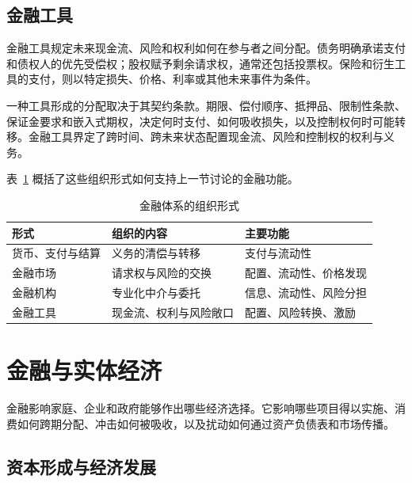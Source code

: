 \subsection{金融工具}

金融工具规定未来现金流、风险和权利如何在参与者之间分配。债务明确承诺支付和债权人的优先受偿权；股权赋予剩余请求权，通常还包括投票权。保险和衍生工具的支付，则以特定损失、价格、利率或其他未来事件为条件。

一种工具形成的分配取决于其契约条款。期限、偿付顺序、抵押品、限制性条款、保证金要求和嵌入式期权，决定何时支付、如何吸收损失，以及控制权何时可能转移。金融工具界定了跨时间、跨未来状态配置现金流、风险和控制权的权利与义务。

\par\medskip
\noindent
表~\ref{tab:ch1-architecture} 概括了这些组织形式如何支持上一节讨论的金融功能。

\begin{table}[H]
\centering

\caption{金融体系的组织形式}
\label{tab:ch1-architecture}

\begin{tabularx}{\textwidth}{@{}p{3.0cm}X X@{}}
\toprule
\textbf{形式}
&
\textbf{组织的内容}
&
\textbf{主要功能}
\\
\midrule

货币、支付与结算
&
义务的清偿与转移
&
支付与流动性
\\

金融市场
&
请求权与风险的交换
&
配置、流动性、价格发现
\\

金融机构
&
专业化中介与委托
&
信息、流动性、风险分担
\\

金融工具
&
现金流、权利与风险敞口
&
配置、风险转换、激励
\\

\bottomrule
\end{tabularx}

\end{table}

\section{金融与实体经济}

金融影响家庭、企业和政府能够作出哪些经济选择。它影响哪些项目得以实施、消费如何跨期分配、冲击如何被吸收，以及扰动如何通过资产负债表和市场传播。

\subsection{资本形成与经济发展}

